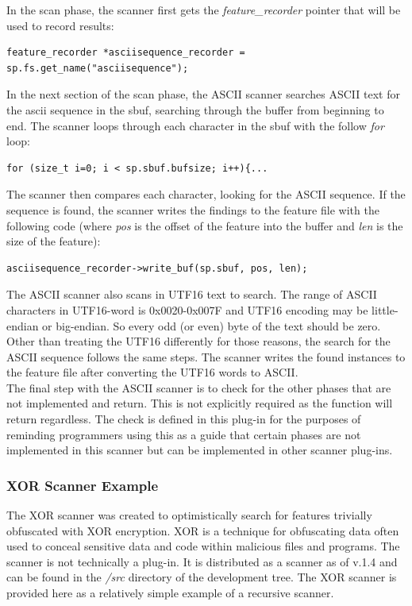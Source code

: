 \documentclass[11pt,fleqn]{article} %
\begin{document}
In the scan phase, the scanner first gets the \textit{feature\_recorder} pointer that will be used to record results:
\begin{lstlisting}
feature_recorder *asciisequence_recorder = sp.fs.get_name("asciisequence");
\end{lstlisting}
 In the next section of the scan phase, the ASCII scanner searches ASCII text for the ascii sequence in the sbuf, searching through the buffer from beginning to end. The scanner loops through each character in the sbuf with the follow \textit{for} loop: 
\begin{lstlisting}
for (size_t i=0; i < sp.sbuf.bufsize; i++){...
\end{lstlisting}
The scanner then compares each character, looking for the ASCII sequence. If the sequence is found, the scanner writes the findings to the feature file with the following code (where \textit{pos} is the offset of the feature into the buffer and \textit{len} is the size of the feature):
\begin{lstlisting}                     
asciisequence_recorder->write_buf(sp.sbuf, pos, len);
\end{lstlisting}
The ASCII scanner also scans in UTF16 text to search. The range of ASCII characters in UTF16-word is 0x0020-0x007F and UTF16 encoding may be little-endian or big-endian. So every odd (or even) byte of the text should be zero. Other than treating the UTF16 differently for those reasons, the search for the ASCII sequence follows the same steps. The scanner writes the found instances to the feature file after converting the UTF16 words to ASCII. \\

The final step with the ASCII scanner is to check for the other phases that are not implemented and return. This is not explicitly required as the function will return regardless. The check is defined in this plug-in for the purposes of reminding programmers using this as a guide that certain phases are not implemented in this scanner but can be implemented in other scanner plug-ins.

\subsubsection{XOR Scanner Example}
\label{scannerxor}
The XOR scanner was created to optimistically search for features trivially obfuscated with XOR encryption. XOR is a technique for obfuscating data often used to conceal sensitive data and code within malicious files and programs.  The scanner is not technically a plug-in. It is distributed as a \bulk scanner as of v.1.4 and can be found in the \textit{/src} directory of the development tree. The XOR scanner is provided here as a relatively simple example of a recursive scanner.\\
\end{document}
